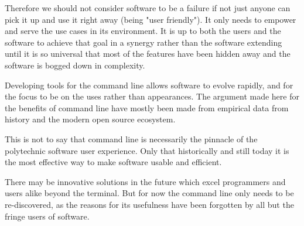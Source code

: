 Therefore we should not consider software to be a failure if not just anyone
can pick it up and use it right away (being "user friendly"). It only needs to
empower and serve the use cases in its environment. It is up to both the users
and the software to achieve that goal in a synergy rather than the software
extending until it is so universal that most of the features have been hidden
away and the software is bogged down in complexity.

Developing tools for the command line allows software to evolve rapidly, and
for the focus to be on the uses rather than appearances. The argument made here
for the benefits of command line have mostly been made from empirical data from
history and the modern open source ecosystem.

This is not to say that command line is necessarily the pinnacle of the polytechnic
software user experience. Only that historically and still today it is the most
effective way to make software usable and efficient.

There may be innovative solutions in the future which excel programmers and
users alike beyond the terminal. But for now the command line only needs to be
re-discovered, as the reasons for its usefulness have been forgotten by all but
the fringe users of software.
